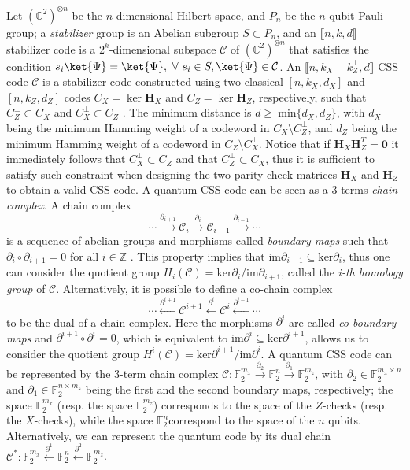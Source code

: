 \documentclass[a4paper,twocolumn,11pt,accepted=2026-05-03]{quantumarticle}
\begin{document}
Let $(\mathbb{C}^2)^{\otimes n}$ be the $n$-dimensional Hilbert space, and $P_n$ be the $n$-qubit Pauli group; a \textit{stabilizer} group is an Abelian subgroup $S \subset P_n$, and an $\llbracket n,k,d \rrbracket$ stabilizer code  is a $2^k$-dimensional subspace $\mathcal{C}$ of $(\mathbb{C}^2)^{\otimes n}$ that satisfies the condition $s_i\ket{\Psi} = \ket{\Psi},\ \forall\ s_i\in S, \ket{\Psi}\in \mathcal{C}$. An $\llbracket n, k_X-k_Z^{\perp}, d \rrbracket $ CSS code $\mathcal{C}$ is a stabilizer code constructed using two classical  $[n,k_X,d_X]$ and $[n,k_Z,d_Z]$ codes $C_X = \ker \mathbf{H}_X$ and $C_Z = \ker \mathbf{H}_Z$, respectively, such that $C_Z^{\perp} \subset C_X$ and $C_X^{\perp} \subset C_Z$ \cite{calderbank_good_1996}. The minimum distance is $d\geq~\mathrm{min}\{d_X,d_Z\}$, with $d_X$ being the minimum Hamming weight of a codeword in $C_X \setminus C_Z^{\perp}$, and $d_Z$ being the minimum Hamming weight of a codeword in $C_Z \setminus C_X^{\perp}$. Notice that if $\mathbf{H}_X\mathbf{H}_Z^T=\mathbf{0}$ it immediately follows that $C_X^{\perp} \subset C_Z$ and that $C_Z^{\perp} \subset C_X$, thus it is sufficient to satisfy such constraint when designing the two parity check matrices $\mathbf{H}_X$ and $\mathbf{H}_Z$ to obtain a valid CSS code. A quantum CSS code can be seen as a 3-terms \textit{chain complex}. A chain complex 
$$
\cdots \xrightarrow{\partial_{i+1}} \mathcal{C}_i \xrightarrow{\partial_{i}} \mathcal{C}_{i-1} \xrightarrow{\partial_{i-1}} \cdots
$$
is a sequence of abelian groups and morphisms called \textit{boundary maps} such that $\partial_i \circ \partial_{i+1} = 0$ for all $i \in \mathbb{Z}$ \cite{panteleev_asymptotically_2022}. This property implies that $\mathrm{im}\partial_{i+1} \subseteq \mathrm{ker}\partial_i$, thus one can consider the quotient group $H_i(\mathcal{C}) = \mathrm{ker}\partial_i / \mathrm{im}\partial_{i+1}$, called the \textit{i-th homology group} of $\mathcal{C}$. Alternatively, it is possible to define a co-chain complex
$$
\cdots \xleftarrow{\partial^{i+1}} \mathcal{C}^{i+1} \xleftarrow{\partial^{i}} \mathcal{C}^{i} \xleftarrow{\partial^{i-1}} \cdots
$$
to be the dual of a chain complex. Here the morphisms $\partial^i$ are called \textit{co-boundary maps} and $\partial^{i+1} \circ \partial^{i} = 0$, which is equivalent to $\mathrm{im}\partial^{i} \subseteq \mathrm{ker}\partial^{i+1}$, allows us to consider the quotient group $H^i(\mathcal{C}) =  \mathrm{ker}\partial^{i+1} / \mathrm{im}\partial^{i} $. 
A quantum CSS code can be represented by the 3-term chain complex $\mathcal{C}: \mathbb{F}_2^{m_x}\xrightarrow{\partial_2} \mathbb{F}_2^{n} \xrightarrow{\partial_1}  \mathbb{F}_2^{m_z} $, with $\partial_2 \in \mathbb{F}_2^{m_x\times n}$ and  $\partial_1 \in \mathbb{F}_2^{n\times m_z}$ being the first and the second boundary maps, respectively; the space $\mathbb{F}_2^{m_x}$ (resp. the space $\mathbb{F}_2^{m_z}$) corresponds to the space of the $Z$-checks (resp. the $X$-checks), while the space $\mathbb{F}_2^{n} $correspond to the space of the $n$ qubits. Alternatively, we can represent the quantum code by its dual chain $\mathcal{C}^{*}: \mathbb{F}_2^{m_x}\xleftarrow{\partial^1} \mathbb{F}_2^{n} \xleftarrow{\partial^2}  \mathbb{F}_2^{m_z} $. 
\end{document}
